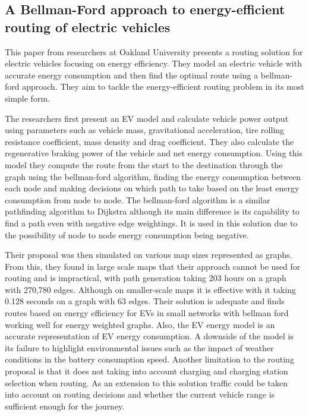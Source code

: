\documentclass[11pt]{report}
\begin{document}
\subsection{A Bellman-Ford approach to energy-efficient routing of electric vehicles \autocite{bellmanFordRouting}}

This paper from researchers at Oakland University presents a routing solution for electric vehicles focusing on energy efficiency. They model an electric vehicle with accurate energy consumption and then find the optimal route using a bellman-ford approach. They aim to tackle the energy-efficient routing problem in its most simple form.

The researchers first present an EV model and calculate vehicle power output using parameters such as vehicle mass, gravitational acceleration, tire rolling resistance coefficient, mass density and drag coefficient. They also calculate the regenerative braking power of the vehicle and net energy consumption. Using this model they compute the route from the start to the destination through the graph using the bellman-ford algorithm, finding the energy consumption between each node and making decisions on which path to take based on the least energy consumption from node to node. The bellman-ford algorithm \autocite{bellman1958routing} is a similar pathfinding algorithm to Dijkstra although its main difference is its capability to find a path even with negative edge weightings. It is used in this solution due to the possibility of node to node energy consumption being negative.

Their proposal was then simulated on various map sizes represented as graphs. From this, they found in large scale maps that their approach cannot be used for routing and is impractical, with path generation taking 203 hours on a graph with 270,780 edges. Although on smaller-scale maps it is effective with it taking 0.128 seconds on a graph with 63 edges. Their solution is adequate and finds routes based on energy efficiency for EVs in small networks with bellman ford working well for energy weighted graphs. Also, the EV energy model is an accurate representation of EV energy consumption. A downside of the model is its failure to highlight environmental issues such as the impact of weather conditions in the battery consumption speed. Another limitation to the routing proposal is that it does not taking into account charging and charging station selection when routing. As an extension to this solution traffic could be taken into account on routing decisions and whether the current vehicle range is sufficient  enough for the journey.
\end{document}
